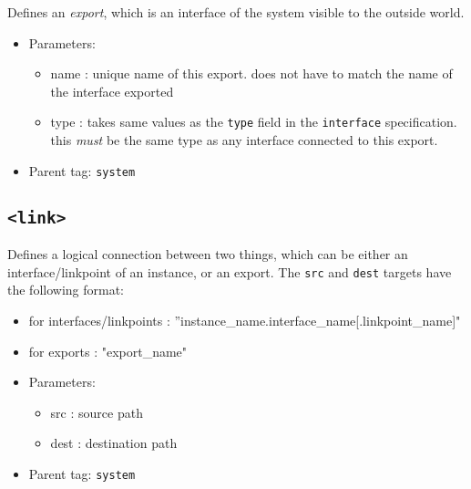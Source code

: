 \documentclass{article}
\begin{document}
Defines an \textit{export}, which is an interface of the system visible to the outside world. 

\begin{itemize}
\item{Parameters:}
\begin{itemize}
\item{name : unique name of this export. does not have to match the name of the interface exported}
\item{type : takes same values as the \texttt{type} field in the \texttt{interface} specification. this \textit{must} be the same type as any interface connected to this export.}
\end{itemize}
\item{Parent tag: \texttt{system}}
\end{itemize}

\subsection{\texttt{<link>}}

Defines a logical connection between two things, which can be either an interface/linkpoint of an instance, or an export. The \texttt{src} and \texttt{dest} targets have the following format:
\begin{itemize}
\item{for interfaces/linkpoints : ''instance\_name.interface\_name[.linkpoint\_name]"}
\item{for exports : "export\_name"}
\end{itemize}

\begin{itemize}
\item{Parameters:}
\begin{itemize}
\item{src : source path}
\item{dest : destination path}
\end{itemize}
\item{Parent tag: \texttt{system}}
\end{itemize}
\end{document}
